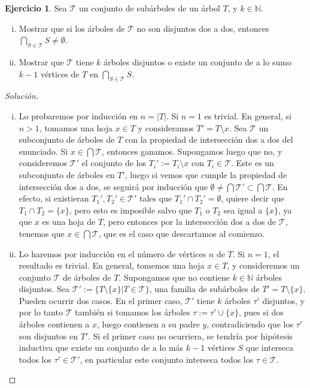 \documentclass[12pt]{report}
\theoremstyle{plain}
\theoremstyle{definition}
\newtheorem{exercise}[theorem]{Ejercicio}
\newenvironment{solution}{\begin{proof}[Solución]}{\end{proof}}
\newcommand{\naturals}{\mathbb{N}}
\newcommand{\abs}[1]{\left \vert #1 \right \vert}
\begin{document}
\begin{exercise}\label{ejercicio:ejercicio sobre interseccion de subarboles en un arbol con dos items}
Sea $\mathcal T$ un conjunto de subárboles de un árbol $T$, y $k \in \naturals$.
\begin{enumerate}[(i)]
\item Mostrar que si los árboles de $\mathcal T$ no son disjuntos dos a dos, entonces $\bigcap_{S \in \mathcal T} S \neq \emptyset$.
\item Mostrar que $\mathcal T$ tiene $k$ árboles disjuntos o existe un conjunto de a lo sumo $k-1$ vértices
de $T$ en $\bigcap_{S \in \mathcal T} S$.
\end{enumerate}
\end{exercise}
\begin{solution}
\begin{enumerate}[(i)]
\item Lo probaremos por inducción en $n = \abs T$. Si $n = 1$ es trivial. En general, si $n>1$, tomamos una hoja $x \in T$ y consideramos $T' = T \setminus x$. Sea $\mathcal T$ un subconjunto de árboles de $T$ con la propiedad de intersección dos a dos del enunciado. Si $x \in \bigcap \mathcal T$, entonces ganamos. Supongamos luego que no, y consideremos $\mathcal T '$ el conjunto de los $T_i' := T_i \setminus x$ con $T_i \in \mathcal T$. Este es un subconjunto de árboles en $T'$, luego si vemos que cumple la propiedad de intersección dos a dos, se seguirá por inducción que $\emptyset \neq \bigcap \mathcal T ' \subset \bigcap \mathcal T$. En efecto, si existieran $T_1', T_2' \in \mathcal T'$ tales que $T_1' \cap T_2' = \emptyset$, quiere decir que $T_1 \cap T_2 = \{x\}$, pero esto es imposible salvo que $T_1$ o  $T_2$ sea igual a $\{ x \}$, ya que $x$ es una hoja de $T$, pero entonces por la intersección dos a dos de $\mathcal T$, tenemos que $x \in \bigcap \mathcal T$, que es el caso que descartamos al comienzo.
\item Lo haremos por inducción en el número de vértices $n$ de $T$. Si $n = 1$, el resultado es trivial. En
general, tomemos una hoja $x \in T$, y consideremos un conjunto $\mathcal T$ de árboles de $T$. Supongamos que no
contiene $k \in \naturals$ árboles disjuntos. Sea $\mathcal T ' := \{ T \setminus \{x \} | T \in \mathcal T \}$, una familia de subárboles de $T' = T \setminus \{x\}$.
Pueden ocurrir dos casos. En el primer caso, $\mathcal T '$ tiene $k$ árboles $\tau'$ disjuntos, y por lo tanto $\mathcal T$ también si tomamos los árboles $\tau := \tau ' \cup \{x\}$, pues si dos árboles contienen a $x$, luego contienen a su padre $y$, contradiciendo que los $\tau '$ son disjuntos en $T'$. Si el primer caso no ocurriera, se tendría por hipótesis inductiva que existe un conjunto de a lo más $k-1$ vértices $S$ que interseca todos los $\tau ' \in \mathcal T '$, en particular este conjunto interseca todos los $\tau \in \mathcal T$.
\end{enumerate}
\end{solution}
\end{document}
